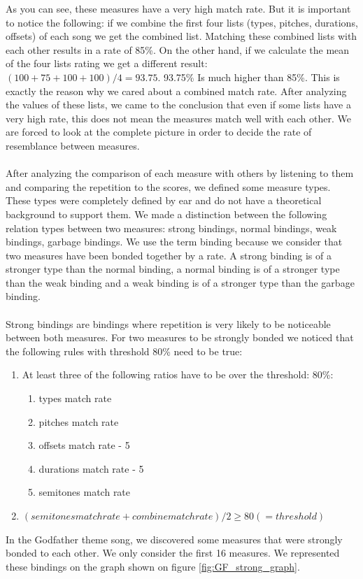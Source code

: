 \documentclass[a4paper]{article}
\begin{document}
As you can see, these measures have a very high match rate. But it is important to notice the following: if we combine the first four lists (types, pitches, durations, offsets) of each song we get the combined list. Matching these combined lists with each other results in a rate of 85\%. On the other hand, if we calculate the mean of the four lists rating we get a different result: $(100 +75+100+100) /4 = 93.75 $. 93.75\% Is much higher than 85\%. This is exactly the reason why we cared about a combined match rate. After analyzing the values of these lists, we came to the conclusion that even if some lists have a very high rate, this does not mean the measures match well with each other. We are forced to look at the complete picture in order to decide the rate of resemblance between measures.
\\\\
After analyzing the comparison of each measure with others by listening to them and comparing the repetition to the scores, we defined some measure types. These types were completely defined by ear and do not have a theoretical background to support them. We made a distinction between the following relation types between two measures: strong bindings, normal bindings, weak bindings, garbage bindings. We use the term binding because we consider that two measures have been bonded together by a rate. A strong binding is of a stronger type than the normal binding, a normal binding is of a stronger type than the weak binding and a weak binding is of a stronger type than the garbage binding.
\\\\
Strong bindings are bindings where repetition is very likely to be noticeable between both measures. For two measures to be strongly bonded we noticed that the following rules with threshold 80\% need to be true:
\begin{enumerate}
	\item At least three of the following ratios have to be over the threshold: 80\%: 
			\begin{enumerate}
				\item types match rate
				\item pitches match rate 
				\item offsets match rate - 5
				\item durations match rate - 5
				\item semitones match rate 
			\end{enumerate}
	
	\item $(semitones match rate + combine match rate) / 2 \geq 80 (= threshold)$
\end{enumerate}
In the Godfather theme song, we discovered some measures that were strongly bonded to each other. We only consider the first 16 measures. We represented these bindings on the graph shown on figure \ref{fig:GF_strong_graph}.
\end{document}
